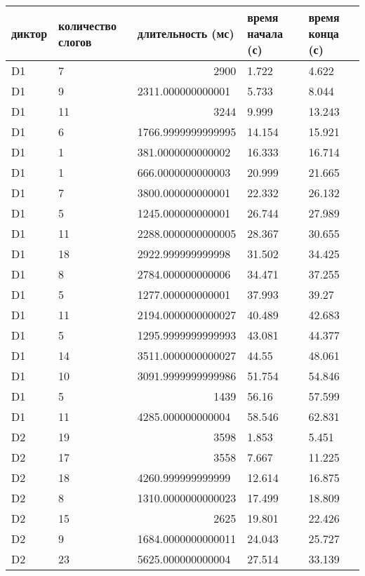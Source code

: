 \begin{longtable}{|l|l|l|l|l|}
\hline
диктор & количество слогов & длительность (мс) & время начала (с) & время конца (с)\\
\hline \endhead
D1 & 7 & \multicolumn{1}{r|}{2900} & 1.722 & 4.622 \\ \hline
D1 & 9 & 2311.000000000001 & 5.733 & 8.044 \\ \hline
D1 & 11 & \multicolumn{1}{r|}{3244} & 9.999 & 13.243 \\ \hline
D1 & 6 & 1766.9999999999995 & 14.154 & 15.921 \\ \hline
D1 & 1 & 381.0000000000002 & 16.333 & 16.714 \\ \hline
D1 & 1 & 666.0000000000003 & 20.999 & 21.665 \\ \hline
D1 & 7 & 3800.000000000001 & 22.332 & 26.132 \\ \hline
D1 & 5 & 1245.000000000001 & 26.744 & 27.989 \\ \hline
D1 & 11 & 2288.0000000000005 & 28.367 & 30.655 \\ \hline
D1 & 18 & 2922.999999999998 & 31.502 & 34.425 \\ \hline
D1 & 8 & 2784.000000000006 & 34.471 & 37.255 \\ \hline
D1 & 5 & 1277.000000000001 & 37.993 & 39.27 \\ \hline
D1 & 11 & 2194.0000000000027 & 40.489 & 42.683 \\ \hline
D1 & 5 & 1295.9999999999993 & 43.081 & 44.377 \\ \hline
D1 & 14 & 3511.0000000000027 & 44.55 & 48.061 \\ \hline
D1 & 10 & 3091.9999999999986 & 51.754 & 54.846 \\ \hline
D1 & 5 & \multicolumn{1}{r|}{1439} & 56.16 & 57.599 \\ \hline
D1 & 11 & 4285.000000000004 & 58.546 & 62.831 \\ \hline
D2 & 19 & \multicolumn{1}{r|}{3598} & 1.853 & 5.451 \\ \hline
D2 & 17 & \multicolumn{1}{r|}{3558} & 7.667 & 11.225 \\ \hline
D2 & 18 & 4260.999999999999 & 12.614 & 16.875 \\ \hline
D2 & 8 & 1310.0000000000023 & 17.499 & 18.809 \\ \hline
D2 & 15 & \multicolumn{1}{r|}{2625} & 19.801 & 22.426 \\ \hline
D2 & 9 & 1684.0000000000011 & 24.043 & 25.727 \\ \hline
D2 & 23 & 5625.000000000004 & 27.514 & 33.139 \\ \hline

\end{longtable}
